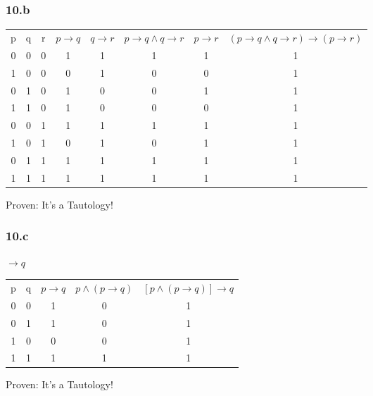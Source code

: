 \documentclass[12pt]{article}
\begin{document}
\subsubsection{10.b}
\begin{table}[tbh]
  \begin{tabular}{cccccccc}
    p  & q  & r &$p \rightarrow q$ & $q \rightarrow r$&$p \rightarrow q \wedge q \rightarrow r$&$p \rightarrow r$&$(p \rightarrow q \wedge q \rightarrow r) \rightarrow (p \rightarrow r) $\\
    0& 0& 0& 1& 1& 1& 1& 1\\
    1& 0& 0& 0& 1& 0& 0& 1\\
    0& 1& 0& 1& 0& 0& 1& 1\\
    1& 1& 0& 1& 0& 0& 0& 1\\
    0& 0& 1& 1& 1& 1& 1& 1\\
    1& 0& 1& 0& 1& 0& 1& 1\\
    0& 1& 1& 1& 1& 1& 1& 1\\
    1& 1& 1& 1& 1& 1& 1& 1
  \end{tabular}
\end{table}

Proven: It's a Tautology!

\subsubsection{10.c}

\begin{math}
  [p \wedge (p\rightarrow q)] \rightarrow q
\end{math}

\begin{table}[tbh]
  \begin{tabular}{ccccc}
    p & q& $p\rightarrow q$&$p\wedge(p\rightarrow q)$&$[p\wedge(p\rightarrow q)]\rightarrow q$\\
    0& 0& 1& 0& 1\\
    0& 1& 1& 0& 1\\
    1& 0& 0& 0& 1\\
    1& 1& 1& 1& 1
  \end{tabular}
\end{table}

Proven: It's a Tautology!
\end{document}
